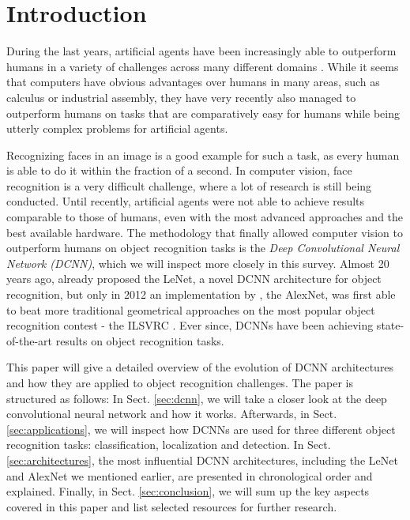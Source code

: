\documentclass[conference]{IEEEtran}
\begin{document}
\section{Introduction}\label{sec:introduction}
During the last years, artificial agents have been increasingly able to outperform humans in a variety of challenges across many different domains \cite{tesauro1995temporal,schaeffer2007checkers,Atari,bowling2015heads,AlphaGo}. While it seems that computers have obvious advantages over humans in many areas, such as calculus or industrial assembly, they have very recently also managed to outperform humans on tasks that are comparatively easy for humans while being utterly complex problems for artificial agents.

Recognizing faces in an image is a good example for such a task, as every human is able to do it within the fraction of a second. In computer vision, face recognition is a very difficult challenge, where a lot of research is still being conducted. Until recently, artificial agents were not able to achieve results comparable to those of humans, even with the most advanced approaches and the best available hardware. The methodology that finally allowed computer vision to outperform humans on object recognition tasks \cite{ILSVRC} is the \emph{Deep Convolutional Neural Network (DCNN)}, which we will inspect more closely in this survey. Almost 20 years ago, \cite{LeNet5} already proposed the LeNet, a novel DCNN architecture for object recognition, but only in 2012 an implementation by \cite{AlexNet}, the AlexNet, was first able to beat more traditional geometrical approaches on the most popular object recognition contest - the ILSVRC \cite{ILSVRC}. Ever since, DCNNs have been achieving state-of-the-art results on object recognition tasks.

This paper will give a detailed overview of the evolution of DCNN architectures and how they are applied to object recognition challenges. The paper is structured as follows: In Sect. \ref{sec:dcnn}, we will take a closer look at the deep convolutional neural network and how it works. Afterwards, in Sect. \ref{sec:applications}, we will inspect how DCNNs are used for three different object recognition tasks: classification, localization and detection. In Sect. \ref{sec:architectures}, the most influential DCNN architectures, including the LeNet and AlexNet we mentioned earlier, are presented in chronological order and explained. Finally, in Sect. \ref{sec:conclusion}, we will sum up the key aspects covered in this paper and list selected resources for further research.
\end{document}
